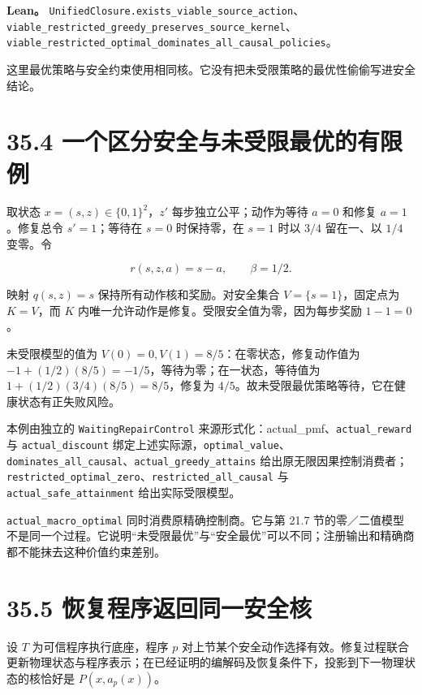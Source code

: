 \documentclass[
  11pt,
  oneside]{book}
\begin{document}
\textbf{Lean。} \nolinkurl{UnifiedClosure.exists_viable_source_action}、\nolinkurl{viable_restricted_greedy_preserves_source_kernel}、\nolinkurl{viable_restricted_optimal_dominates_all_causal_policies}。

这里最优策略与安全约束使用相同核。它没有把未受限策略的最优性偷偷写进安全结论。

\section{35.4 一个区分安全与未受限最优的有限例}\label{ux4e00ux4e2aux533aux5206ux5b89ux5168ux4e0eux672aux53d7ux9650ux6700ux4f18ux7684ux6709ux9650ux4f8b}

取状态 \(x=(s,z)\in\{0,1\}^2\)，\(z'\) 每步独立公平；动作为等待 \(a=0\) 和修复 \(a=1\)。修复总令 \(s'=1\)；等待在 \(s=0\) 时保持零，在 \(s=1\) 时以 \(3/4\) 留在一、以 \(1/4\) 变零。令

\[r(s,z,a)=s-a,\qquad\beta=1/2.\]

映射 \(q(s,z)=s\) 保持所有动作核和奖励。对安全集合 \(V=\{s=1\}\)，固定点为 \(K=V\)，而 \(K\) 内唯一允许动作是修复。受限安全值为零，因为每步奖励 \(1-1=0\)。

未受限模型的值为 \(V(0)=0,V(1)=8/5\)：在零状态，修复动作值为 \(-1+(1/2)(8/5)=-1/5\)，等待为零；在一状态，等待值为 \(1+(1/2)(3/4)(8/5)=8/5\)，修复为 \(4/5\)。故未受限最优策略等待，它在健康状态有正失败风险。

本例由独立的 \nolinkurl{WaitingRepairControl} 来源形式化：actual\_pmf、\nolinkurl{actual_reward} 与 \nolinkurl{actual_discount} 绑定上述实际源，\nolinkurl{optimal_value}、\nolinkurl{dominates_all_causal}、\nolinkurl{actual_greedy_attains} 给出原无限因果控制消费者；\nolinkurl{restricted_optimal_zero}、\nolinkurl{restricted_all_causal} 与 \nolinkurl{actual_safe_attainment} 给出实际受限模型。

\nolinkurl{actual_macro_optimal} 同时消费原精确控制商。它与第 21.7 节的零／二值模型不是同一个过程。它说明``未受限最优''与``安全最优''可以不同；注册输出和精确商都不能抹去这种价值约束差别。

\section{35.5 恢复程序返回同一安全核}\label{ux6062ux590dux7a0bux5e8fux8fd4ux56deux540cux4e00ux5b89ux5168ux6838}

设 \(T\) 为可信程序执行底座，程序 \(p\) 对上节某个安全动作选择有效。修复过程联合更新物理状态与程序表示；在已经证明的编解码及恢复条件下，投影到下一物理状态的核恰好是 \(P(x,a_p(x))\)。
\end{document}
